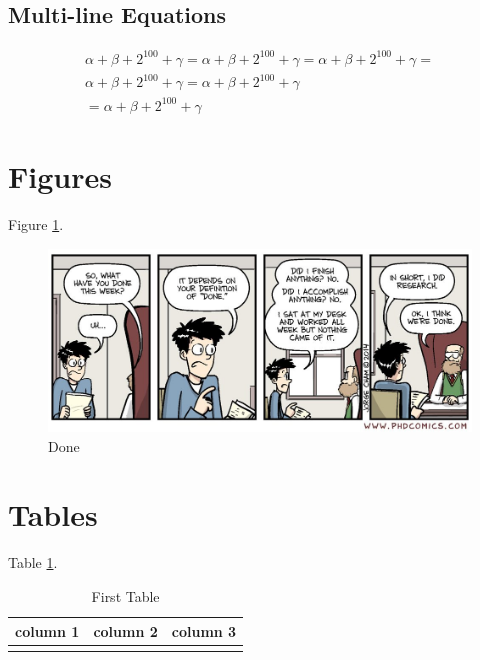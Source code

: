 \documentclass[letterpaper, 12pt, oneside]{book}
\theoremstyle{plain}
\theoremstyle{definition}
\theoremstyle{remark}
\begin{document}
\subsection{Multi-line Equations} %
\label{sub:multi_line_equations}
\begin{multline}
\alpha+\beta+2^{100} + \gamma = \alpha+\beta+2^{100} + \gamma = \alpha+\beta+2^{100} + \gamma = \\
\alpha+\beta+2^{100} + \gamma = \alpha+\beta+2^{100} + \gamma \\
= \alpha+\beta+2^{100} + \gamma 
\end{multline}



\section{Figures} %
\label{sec:figures}
Figure \ref{fig:done}.

\begin{figure}[htbp]
  \centering
  \includegraphics[width=\linewidth]{done.jpg}
  \caption{Done}
  \label{fig:done}
\end{figure}

\lipsum[1]

\section{Tables} %
\label{sec:tables}
Table \ref{tab:tablename}.

\begin{table}[tb]
  \caption{First Table}
  \label{tab:tablename}
  \centering

  \begin{tabular}{l|cc}
  \hline

  \hline
  \textbf{column 1} & \textbf{column 2} & \textbf{column 3} \\
  \hline
     & & \\
  \hline

  \hline
  \end{tabular}
\end{table}
\end{document}

